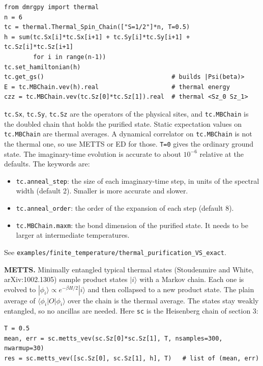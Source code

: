 \documentclass[11pt]{article}
\providecommand{\tightlist}{\setlength{\itemsep}{0pt}\setlength{\parskip}{0pt}}
\begin{document}
\begin{lstlisting}
from dmrgpy import thermal
n = 6
tc = thermal.Thermal_Spin_Chain(["S=1/2"]*n, T=0.5)
h = sum(tc.Sx[i]*tc.Sx[i+1] + tc.Sy[i]*tc.Sy[i+1] + tc.Sz[i]*tc.Sz[i+1]
        for i in range(n-1))
tc.set_hamiltonian(h)
tc.get_gs()                                   # builds |Psi(beta)>
E = tc.MBChain.vev(h).real                    # thermal energy
czz = tc.MBChain.vev(tc.Sz[0]*tc.Sz[1]).real  # thermal <Sz_0 Sz_1>
\end{lstlisting}

\texttt{tc.\allowbreak{}Sx}, \texttt{tc.\allowbreak{}Sy}, \texttt{tc.\allowbreak{}Sz} are the operators of the physical sites, and
\texttt{tc.\allowbreak{}MBChain} is the doubled chain that holds the purified state. Static
expectation values on \texttt{tc.\allowbreak{}MBChain} are thermal averages. A dynamical
correlator on \texttt{tc.\allowbreak{}MBChain} is not the thermal one, so use METTS or ED for
those. \texttt{T=0} gives the ordinary ground state. The imaginary-time evolution
is accurate to about \(10^{-6}\) relative at the defaults. The keywords are:

\begin{itemize}
\tightlist
\item
  \texttt{tc.\allowbreak{}anneal\_\allowbreak{}step}: the size of each imaginary-time step, in units of the
  spectral width (default 2). Smaller is more accurate and slower.
\item
  \texttt{tc.\allowbreak{}anneal\_\allowbreak{}order}: the order of the expansion of each step (default 8).
\item
  \texttt{tc.\allowbreak{}MBChain.\allowbreak{}maxm}: the bond dimension of the purified state. It needs
  to be larger at intermediate temperatures.
\end{itemize}

See \texttt{examples/finite\_\allowbreak{}temperature/thermal\_\allowbreak{}purification\_\allowbreak{}VS\_\allowbreak{}exact}.

\textbf{METTS.} Minimally entangled typical thermal states (Stoudenmire and
White, arXiv:1002.1305) sample product states \(|i\rangle\) with a Markov
chain. Each one is evolved to
\(|\phi_i\rangle\propto e^{-\beta H/2}|i\rangle\) and then collapsed to a new
product state. The plain average of \(\langle\phi_i|O|\phi_i\rangle\) over
the chain is the thermal average. The states stay weakly entangled, so
no ancillas are needed. Here \texttt{sc} is the Heisenberg chain of section 3:

\begin{lstlisting}
T = 0.5
mean, err = sc.metts_vev(sc.Sz[0]*sc.Sz[1], T, nsamples=300, nwarmup=30)
res = sc.metts_vev([sc.Sz[0], sc.Sz[1], h], T)   # list of (mean, err)
\end{lstlisting}
\end{document}
